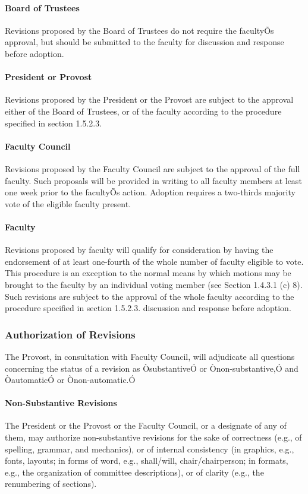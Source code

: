 \documentclass[letterpaper, 11pt]{article}
\begin{document}
			\paragraph{Board of Trustees}
				Revisions proposed by the Board of Trustees do not require the facultyÕs approval, but should be submitted to the faculty for discussion and response before adoption.
			\paragraph{President or Provost}
				Revisions proposed by the President or the Provost are subject to the approval either of the Board of Trustees, or of the faculty according to the procedure specified in section 1.5.2.3.
			\paragraph{Faculty Council}
				Revisions proposed by the Faculty Council are subject to the approval of the full faculty. Such proposals will be provided in writing to all faculty members at least one week prior to the facultyÕs action. Adoption requires a two-thirds majority vote of the eligible faculty present.
			\paragraph{Faculty}
				Revisions proposed by faculty will qualify for consideration by having the endorsement of at least one-fourth of the whole number of faculty eligible to vote. This procedure is an exception to the normal means by which motions may be brought to the faculty by an individual voting member (see Section 1.4.3.1 (c) 8).  Such revisions are subject to the approval of the whole faculty according to the procedure specified in section 1.5.2.3.
				discussion and response before adoption.
		\subsubsection{Authorization of Revisions}
			The Provost, in consultation with Faculty Council, will adjudicate all questions concerning the status of a revision as ÒsubstantiveÓ or Ònon-substantive,Ó and ÒautomaticÓ or Ònon-automatic.Ó
			\paragraph{Non-Substantive Revisions}
				The President or the Provost or the Faculty Council, or a designate of any of them, may authorize non-substantive revisions for the sake of correctness (e.g., of spelling, grammar, and mechanics), or of internal consistency (in graphics, e.g., fonts, layouts; in forms of word, e.g., shall/will, chair/chairperson; in formats, e.g., the organization of committee descriptions), or of clarity (e.g., the renumbering of sections).
\end{document}
